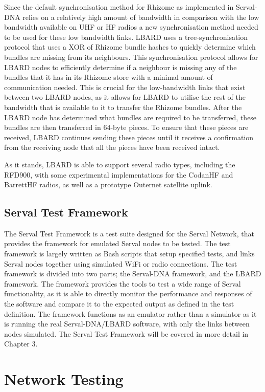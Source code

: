 Since the default synchronisation method for Rhizome as implemented in Serval-DNA relies on a relatively high amount of bandwidth in comparison with the low bandwidth available on UHF or HF radios a new synchronisation method needed to be used for these low bandwidth links.
LBARD uses a tree-synchronisation protocol that uses a XOR of Rhizome bundle hashes to quickly determine which bundles are missing from its neighbours. 
This synchronisation protocol allows for LBARD nodes to efficiently determine if a neighbour is missing any of the bundles that it has in its Rhizome store with a minimal amount of communication needed.
This is crucial for the low-bandwidth links that exist between two LBARD nodes, as it allows for LBARD to utilise the rest of the bandwidth that is available to it to transfer the Rhizome bundles. 
After the LBARD node has determined what bundles are required to be transferred, these bundles are then transferred in 64-byte pieces.
To ensure that these pieces are received, LBARD continues sending these pieces until it receives a confirmation from the receiving node that all the pieces have been received intact.

As it stands, LBARD is able to support several radio types, including the RFD900, with some experimental implementations for the CodanHF and BarrettHF radios, as well as a prototype Outernet satellite uplink.


\subsection{Serval Test Framework}
The Serval Test Framework is a test suite designed for the Serval Network, that provides the framework for emulated Serval nodes to be tested.
The test framework is largely written as Bash scripts that setup specified tests, and links Serval nodes together using simulated WiFi or radio connections.
The test framework is divided into two parts; the Serval-DNA framework, and the LBARD framework.
The framework provides the tools to test a wide range of Serval functionality, as it is able to directly monitor the performance and responses of the software and compare it to the expected output as defined in the test definition.
The framework functions as an emulator rather than a simulator as it is running the real Serval-DNA/LBARD software, with only the links between nodes simulated.
The Serval Test Framework will be covered in more detail in Chapter 3.



\section{Network Testing}

